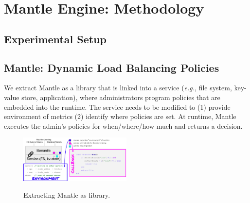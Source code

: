 \section{Mantle Engine: Methodology}

\subsection{Experimental Setup}

\subsection{Mantle: Dynamic Load Balancing Policies}



We extract Mantle as a library that is linked into a service ({\it e.g.}, file
system, key-value store, application), where administrators program policies
that are embedded into the runtime.  The service needs to be modified to (1)
provide environment of metrics (2) identify where policies are set. At runtime,
Mantle executes the admin's policies for when/where/how much and returns a
decision.

\begin{figure}[t]
  \noindent\includegraphics[width=0.5\textwidth]{figures/mantle.png}\\

  \caption{Extracting Mantle as library.\label{fig:mantle}}

\end{figure}

